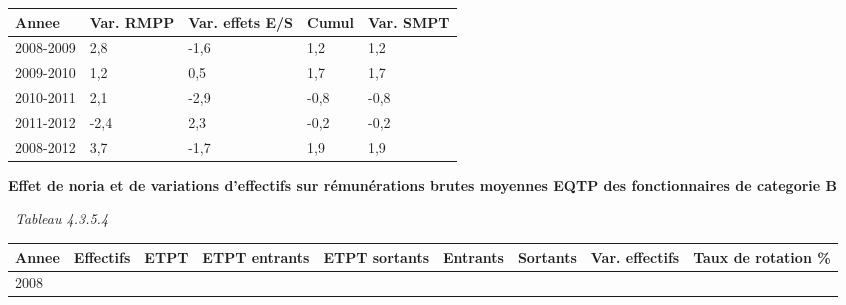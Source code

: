 \begin{longtable}[]{@{}lllll@{}}
\toprule
Annee & Var. RMPP & Var. effets E/S & Cumul & Var. SMPT\tabularnewline
\midrule
\endhead
2008-2009 & 2,8 & -1,6 & 1,2 & 1,2\tabularnewline
2009-2010 & 1,2 & 0,5 & 1,7 & 1,7\tabularnewline
2010-2011 & 2,1 & -2,9 & -0,8 & -0,8\tabularnewline
2011-2012 & -2,4 & 2,3 & -0,2 & -0,2\tabularnewline
2008-2012 & 3,7 & -1,7 & 1,9 & 1,9\tabularnewline
\bottomrule
\end{longtable}

\textbf{Effet de noria et de variations d'effectifs sur rémunérations
brutes moyennes EQTP des fonctionnaires de categorie B}

~\emph{Tableau 4.3.5.4}

\begin{longtable}[]{@{}lllllllll@{}}
\toprule
\begin{minipage}[b]{0.05\columnwidth}\raggedright
Annee\strut
\end{minipage} & \begin{minipage}[b]{0.08\columnwidth}\raggedright
Effectifs\strut
\end{minipage} & \begin{minipage}[b]{0.05\columnwidth}\raggedright
ETPT\strut
\end{minipage} & \begin{minipage}[b]{0.10\columnwidth}\raggedright
ETPT entrants\strut
\end{minipage} & \begin{minipage}[b]{0.10\columnwidth}\raggedright
ETPT sortants\strut
\end{minipage} & \begin{minipage}[b]{0.07\columnwidth}\raggedright
Entrants\strut
\end{minipage} & \begin{minipage}[b]{0.07\columnwidth}\raggedright
Sortants\strut
\end{minipage} & \begin{minipage}[b]{0.11\columnwidth}\raggedright
Var. effectifs\strut
\end{minipage} & \begin{minipage}[b]{0.14\columnwidth}\raggedright
Taux de rotation \%\strut
\end{minipage}\tabularnewline
\midrule
\endhead
\begin{minipage}[t]{0.05\columnwidth}\raggedright
2008\strut
\end{minipage} & \begin{minipage}[t]{0.08\columnwidth}\raggedright

\end{minipage}
\end{longtable}
